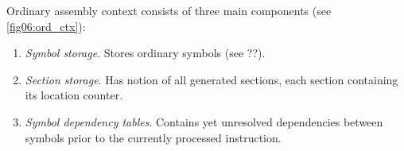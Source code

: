 Ordinary assembly context consists of three main components (see \cref{fig06:ord_ctx}):
\begin{enumerate}
	\item \emph{Symbol storage}. Stores ordinary symbols (see ??).
	\item \emph{Section storage}. Has notion of all generated sections, each section containing its location counter.
	\item \emph{Symbol dependency tables}. Contains yet unresolved dependencies between symbols prior to the currently processed instruction.
\end{enumerate}

